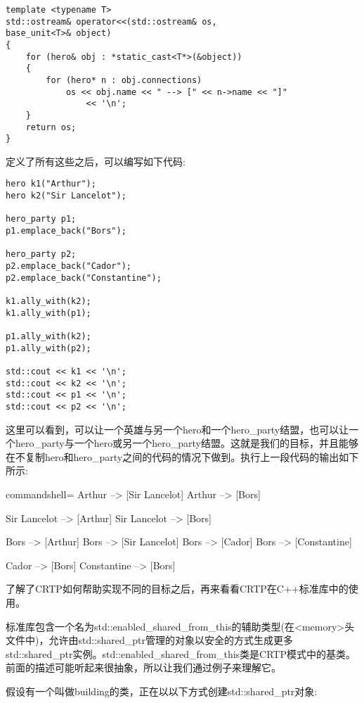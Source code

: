 \begin{lstlisting}[style=styleCXX]
template <typename T>
std::ostream& operator<<(std::ostream& os,
base_unit<T>& object)
{
	for (hero& obj : *static_cast<T*>(&object))
	{
		for (hero* n : obj.connections)
			os << obj.name << " --> [" << n->name << "]"
				<< '\n';
	}
	return os;
}
\end{lstlisting}

定义了所有这些之后，可以编写如下代码:

\begin{lstlisting}[style=styleCXX]
hero k1("Arthur");
hero k2("Sir Lancelot");

hero_party p1;
p1.emplace_back("Bors");

hero_party p2;
p2.emplace_back("Cador");
p2.emplace_back("Constantine");

k1.ally_with(k2);
k1.ally_with(p1);

p1.ally_with(k2);
p1.ally_with(p2);

std::cout << k1 << '\n';
std::cout << k2 << '\n';
std::cout << p1 << '\n';
std::cout << p2 << '\n';
\end{lstlisting}

这里可以看到，可以让一个英雄与另一个hero和一个hero\_party结盟，也可以让一个hero\_party与一个hero或另一个hero\_party结盟。这就是我们的目标，并且能够在不复制hero和hero\_party之间的代码的情况下做到。执行上一段代码的输出如下所示:

\begin{tcblisting}{commandshell={}}
Arthur --> [Sir Lancelot]
Arthur --> [Bors]

Sir Lancelot --> [Arthur]
Sir Lancelot --> [Bors]

Bors --> [Arthur]
Bors --> [Sir Lancelot]
Bors --> [Cador]
Bors --> [Constantine]

Cador --> [Bors]
Constantine --> [Bors]
\end{tcblisting}

了解了CRTP如何帮助实现不同的目标之后，再来看看CRTP在C++标准库中的使用。


标准库包含一个名为std::enabled\_shared\_from\_this的辅助类型(在<memory>头文件中)，允许由std::shared\_ptr管理的对象以安全的方式生成更多std::shared\_ptr实例。std::enabled\_shared\_from\_this类是CRTP模式中的基类。前面的描述可能听起来很抽象，所以让我们通过例子来理解它。

假设有一个叫做building的类，正在以以下方式创建std::shared\_ptr对象:

